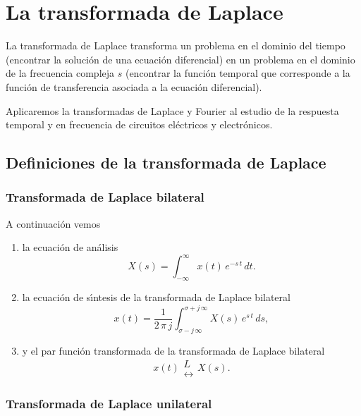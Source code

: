 \chapter{La transformada de Laplace}

La transformada de Laplace transforma un problema en el dominio del tiempo (encontrar la solución de una ecuación diferencial) en un problema en el dominio de la frecuencia compleja $s$ (encontrar la función temporal que corresponde a la función de transferencia asociada a la ecuación diferencial).

Aplicaremos la transformadas de Laplace y Fourier al estudio de la respuesta temporal y en frecuencia de circuitos eléctricos y electrónicos.

\section{Definiciones de la transformada de Laplace}

\subsection{Transformada de Laplace bilateral}

A continuaci\'{o}n vemos 
\begin{enumerate}
\item la ecuaci\'{o}n de an\'{a}lisis
\begin{equation}
	X\left( s\right) =\int_{-\infty }^{\infty }x\left( t\right) \, e^{-s\,
		t} \, dt.
\end{equation}
\item la ecuaci\'{o}n de s\'{\i}ntesis de la transformada de Laplace bilateral
\begin{equation}
  x\left( t\right) =
  \frac{1}{2 \, \pi \, j}\int_{\sigma -j \, \infty }^{\sigma +j \, \infty}X\left(
    s\right) \, e^{s\, t} \, ds,
\end{equation}
\item y el par funci\'{o}n transformada de la transformada de Laplace bilateral
\begin{equation}
  x\left( t\right) 
  \begin{array}{c}
    L \\
    \leftrightarrow
  \end{array}
  X\left( s\right).
\end{equation}
\end{enumerate}

\subsection{Transformada de Laplace unilateral}

